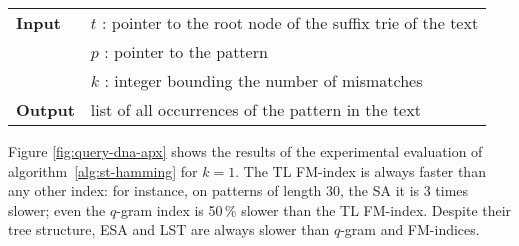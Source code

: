 \begin{figure*}[t]
\begin{center}
\begin{minipage}[t]{.8\textwidth}
\begin{algorithm}[H]
\begin{tabular}{ll}
\textbf{Input}  & $t$ : pointer to the root node of the suffix trie of the text\\
 			    & $p$ : pointer to the pattern\\
 			    & $k$ : integer bounding the number of mismatches\\
\textbf{Output} & list of all occurrences of the pattern in the text\\
\end{tabular}
\begin{algorithmic}[1]
\Else
		\State \Report {}
		\Repeat
			\State {}
			\State {}
			\State {}
		\Until {}
	\EndIf
\EndIf
\end{algorithmic}
\label{alg:st-hamming}
\end{algorithm}
\end{minipage}
\end{center}
\end{figure*}


%

Figure \ref{fig:query-dna-apx} shows the results of the experimental evaluation of algorithm~\ref{alg:st-hamming} for $k=1$.
The TL FM-index is always faster than any other index: for instance, on patterns of length 30, the SA it is 3 times slower; even the $q$-gram index is 50\,\% slower than the TL FM-index.
Despite their tree structure, ESA and LST are always slower than $q$-gram and FM-indices.

